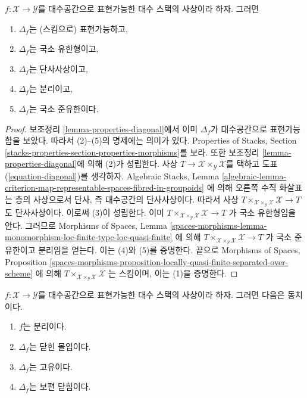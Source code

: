 \begin{lemma}
\label{lemma-properties-diagonal-representable}
$f : \mathcal{X} \to \mathcal{Y}$를 대수공간으로 표현가능한
대수 스택의 사상이라 하자. 그러면
\begin{enumerate}
\item $\Delta_f$는 (스킴으로) 표현가능하고,
\item $\Delta_f$는 국소 유한형이고,
\item $\Delta_f$는 단사사상이고,
\item $\Delta_f$는 분리이고,
\item $\Delta_f$는 국소 준유한이다.
\end{enumerate}
\end{lemma}

\begin{proof}
보조정리 \ref{lemma-properties-diagonal}에서 이미 $\Delta_f$가
대수공간으로 표현가능함을 보았다. 따라서 (2)--(5)의 명제에는 의미가 있다.
Properties of Stacks, Section
\ref{stacks-properties-section-properties-morphisms}를 보라.
또한 보조정리 \ref{lemma-properties-diagonal}에 의해 (2)가 성립한다.
사상 $T \to \mathcal{X} \times_\mathcal{Y} \mathcal{X}$를 택하고
도표 (\ref{equation-diagonal})를 생각하자. Algebraic Stacks, Lemma
\ref{algebraic-lemma-criterion-map-representable-spaces-fibred-in-groupoids}
에 의해 오른쪽 수직 화살표는 층의 사상으로서 단사, 즉 대수공간의
단사사상이다. 따라서 사상
$T \times_{\mathcal{X} \times_\mathcal{Y} \mathcal{X}} \mathcal{X} \to T$
도 단사사상이다. 이로써 (3)이 성립한다. 이미
$T \times_{\mathcal{X} \times_\mathcal{Y} \mathcal{X}} \mathcal{X} \to T$
가 국소 유한형임을 안다. 그러므로 Morphisms of Spaces, Lemma
\ref{spaces-morphisms-lemma-monomorphism-loc-finite-type-loc-quasi-finite}
에 의해
$T \times_{\mathcal{X} \times_\mathcal{Y} \mathcal{X}} \mathcal{X} \to T$
가 국소 준유한이고 분리임을 얻는다. 이는 (4)와 (5)를 증명한다.
끝으로 Morphisms of Spaces, Proposition
\ref{spaces-morphisms-proposition-locally-quasi-finite-separated-over-scheme}
에 의해
$T \times_{\mathcal{X} \times_\mathcal{Y} \mathcal{X}} \mathcal{X}$
는 스킴이며, 이는 (1)을 증명한다.
\end{proof}

\begin{lemma}
\label{lemma-representable-separated-diagonal-closed}
$f : \mathcal{X} \to \mathcal{Y}$를 대수공간으로 표현가능한
대수 스택의 사상이라 하자. 그러면 다음은 동치이다.
\begin{enumerate}
\item $f$는 분리이다.
\item $\Delta_f$는 닫힌 몰입이다.
\item $\Delta_f$는 고유이다.
\item $\Delta_f$는 보편 닫힘이다.
\end{enumerate}
\end{lemma}

